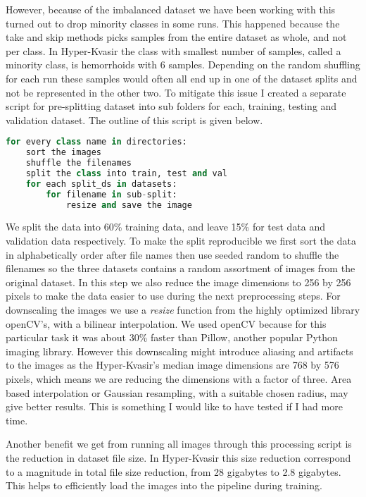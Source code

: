 \documentclass[thesis.tex]{subfiles}
\begin{document}
However, because of the imbalanced dataset we have been working with this turned out to drop minority classes in some runs. This happened because the take and skip methods picks samples from the entire dataset as whole, and not per class. In Hyper-Kvasir the class with smallest number of samples, called a minority class, is hemorrhoids with 6 samples. Depending on the random shuffling for each run these samples would often all end up in one of the dataset splits and not be represented in the other two.
To mitigate this issue I created a separate script for pre-splitting dataset into sub folders for each, training, testing and validation dataset. The outline of this script is given below.

\begin{lstlisting}[language=Python]
for every class name in directories:
	sort the images
	shuffle the filenames
	split the class into train, test and val
	for each split_ds in datasets:
		for filename in sub-split:
			resize and save the image
\end{lstlisting}

We split the data into 60\% training data, and leave 15\% for test data and validation data respectively. To make the split reproducible we first sort the data in alphabetically order after file names then use seeded random to shuffle the filenames so the three datasets contains a random assortment of images from the original dataset. 
In this step we also reduce the image dimensions to 256 by 256 pixels to make the data easier to use during the next preprocessing steps. For downscaling the images we use a \textit{resize} function from the highly optimized library openCV's, with a bilinear interpolation. We used openCV because for this particular task it was about 30\% faster than Pillow, another popular Python imaging library. However this downscaling might introduce aliasing and artifacts to the images as the Hyper-Kvasir's median image dimensions are 768 by 576 pixels, which means we are reducing the dimensions with a factor of three. Area based interpolation \cite{AreaBased99} or Gaussian resampling, with a suitable chosen radius, may give better results. This is something I would like to have tested if I had more time.

Another benefit we get from running all images through this processing script is the reduction in dataset file size. In Hyper-Kvasir this size reduction correspond to a magnitude in total file size reduction, from 28 gigabytes to 2.8 gigabytes. This helps to efficiently load the images into the pipeline during training.
\end{document}
